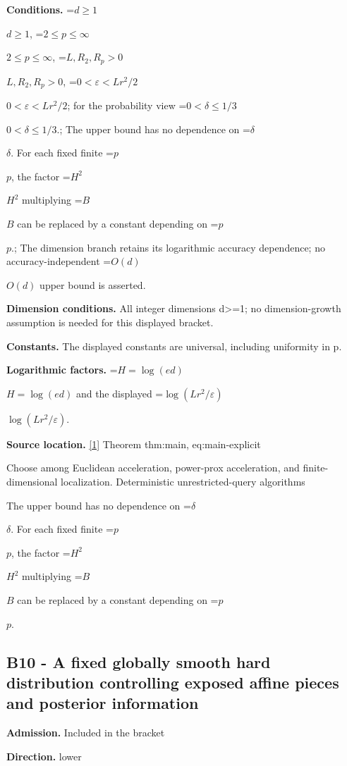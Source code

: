 \documentclass[10pt,a4paper]{article}
\newcommand{\AtlasMath}[1]{\par\begingroup\centering\setbox0=\hbox{$\displaystyle #1$}\ifdim\wd0>1.4\linewidth\typeout{ATLAS WIDE FORMULA: \the\wd0}\fi\ifdim\wd0>\linewidth\resizebox{\linewidth}{!}{\box0}\else\box0\fi\par\endgroup}
\newcommand{\AtlasInlineMath}[1]{\begingroup\setbox0=\hbox{$#1$}\ifdim\wd0>.4\linewidth\endgroup\AtlasMath{#1}\else\endgroup$#1$\fi}
\begin{document}
\textbf{Conditions.} \AtlasInlineMath{d\ge1}, \AtlasInlineMath{2\le p\le\infty}, \AtlasInlineMath{L,R_2,R_p>0}, \AtlasInlineMath{0<\varepsilon<Lr^2/2}; for the probability view \AtlasInlineMath{0<\delta\le1/3}.; The upper bound has no dependence on \AtlasInlineMath{\delta}. For each fixed finite \AtlasInlineMath{p}, the factor \AtlasInlineMath{H^2} multiplying \AtlasInlineMath{B} can be replaced by a constant depending on \AtlasInlineMath{p}.; The dimension branch retains its logarithmic accuracy dependence; no accuracy-independent \AtlasInlineMath{O(d)} upper bound is asserted.



\textbf{Dimension conditions.} All integer dimensions d>=1; no dimension-growth assumption is needed for this displayed bracket.



\textbf{Constants.} The displayed constants are universal, including uniformity in p.



\textbf{Logarithmic factors.} \AtlasInlineMath{H=\log(ed)} and the displayed \AtlasInlineMath{\log(Lr^2/\varepsilon)}.



\textbf{Source location.} \href{https://github.com/WU-Wendao/Colombo/blob/main/colombo_sensorium/Complexity_altas/data/sources/colombo/U02/manuscript.pdf}{[1]} Theorem thm:main, eq:main-explicit



Choose among Euclidean acceleration, power-prox acceleration, and finite-dimensional localization. Deterministic unrestricted-query algorithms



The upper bound has no dependence on \AtlasInlineMath{\delta}. For each fixed finite \AtlasInlineMath{p}, the factor \AtlasInlineMath{H^2} multiplying \AtlasInlineMath{B} can be replaced by a constant depending on \AtlasInlineMath{p}.



\subsection{B10 - A fixed globally smooth hard distribution controlling exposed affine pieces and posterior information}


\textbf{Admission.} Included in the bracket



\textbf{Direction.} lower
\end{document}
